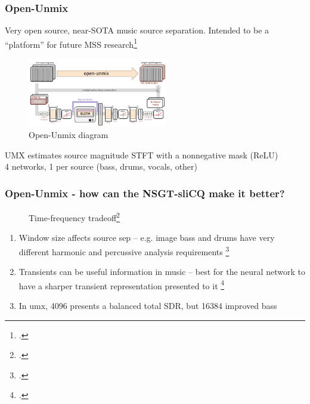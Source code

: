 \documentclass[usenames,dvipsnames]{beamer}
\begin{document}
\begin{frame}
	\frametitle{Open-Unmix}
	Very open source, near-SOTA music source separation. Intended to be a ``platform'' for future MSS research\footcite{umx}
	\begin{figure}[ht]
		\includegraphics[height=3cm]{./umx1.png}
		\caption{Open-Unmix diagram}
	\end{figure}
	UMX estimates source magnitude STFT with a nonnegative mask (ReLU)\\
	4 networks, 1 per source (bass, drums, vocals, other)
\end{frame}

\begin{frame}
	\frametitle{Open-Unmix - how can the NSGT-sliCQ make it better?}
	\begin{figure}[ht]
		\caption{Time-frequency tradeoff\footcite{balazs}}
		\vspace{-0.5em}
	\end{figure}
	\begin{enumerate}
		\item
			Window size affects source sep -- e.g. image bass and drums have very different harmonic and percussive analysis requirements \footcite{musicsepwindow}
		\item
			Transients can be useful information in music -- best for the neural network to have a sharper transient representation presented to it \footcite{transientsep}
		\item
			In umx, 4096 presents a balanced total SDR, but 16384 improved bass
	\end{enumerate}
\end{frame}
\end{document}
